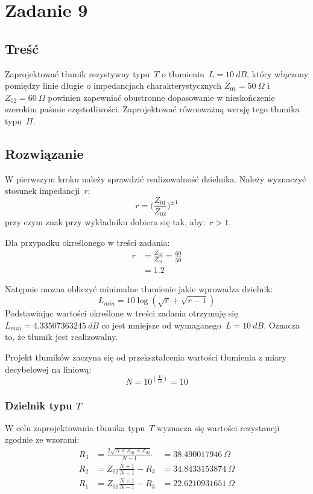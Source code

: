 \documentclass[rep.tex]{subfiles}
\begin{document}
\chapter{Zadanie 9}
\label{zad9}
\section{Treść}
Zaprojektować tłumik rezystywny typu~$T$ o tłumieniu~$L = 10~dB$,
który włączony pomiędzy linie długie o impedancjach charakterystycznych $Z_{01} = 50~\Omega$ i $Z_{02} = 60~\Omega$
powinien zapewniać obustronne dopasowanie w nieskończenie szerokim paśmie częstotliwości.
Zaprojektować równoważną wersję tego tłumika typu~$\Pi$.

\section{Rozwiązanie}
W pierwszym kroku należy sprawdzić realizowalność dzielnika.
Należy wyznaczyć stosunek impedancji~$r$:
\begin{equation}
  r = \Big(\frac{Z_{01}}{Z_{02}}\Big)^{\pm1}
\end{equation}
przy czym znak przy wykładniku dobiera się tak, aby:~$r > 1$.

Dla przypadku określonego w treści zadania:
\begin{align}
  r &= \frac{Z_{02}}{Z_{01}} = \frac{60}{50} \nonumber \\
  &= 1.2 \nonumber
\end{align}

Natępnie mozna obliczyć minimalne tłumienie jakie wprowadza dzielnik:
\begin{equation}
  L_{min} = 10 \log(\sqrt{r} + \sqrt{r - 1})
\end{equation}
Podstawiając wartości określone w treści zadania otrzymuję się~$L_{min} = 4.33507363245~dB$ co jest mniejsze od wymaganego~$L = 10~dB$.
Oznacza to, że tłumik jest realizowalny.

Projekt tłumików zaczyna się od przekształcenia wartości tłumienia z miary decybelowej na liniową:
\begin{equation}
  N = 10^{(\frac{L}{10})} = 10
\end{equation}

\subsection{Dzielnik typu $T$}
W celu zaprojektowania tłumika typu~$T$ wyznacza się wartości rezystancji zgodnie ze wzorami:
\begin{align}
  R_3 &= \frac{2\sqrt{N \times Z_{01} \times Z_{02}}}{N - 1} &= 38.490017946~\Omega \\
  R_2 &= Z_{02} \frac{N + 1}{N - 1} - R_3 &= 34.8433153874~\Omega \\
  R_1 &= Z_{01} \frac{N + 1}{N - 1} - R_3 &= 22.6210931651~\Omega
\end{align}
\end{document}
